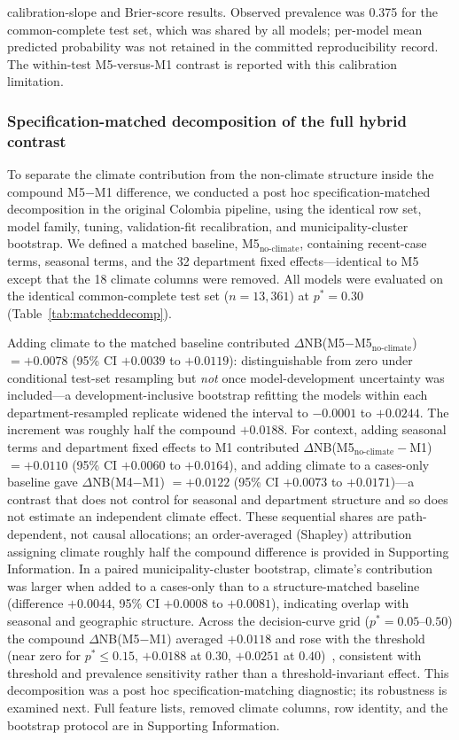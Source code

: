 \documentclass[11pt,a4paper]{article}
\begin{document}
calibration-slope and Brier-score results. Observed prevalence was 0.375 for the common-complete test set, which was shared by all models; per-model mean predicted probability was not retained in the committed reproducibility record. The within-test M5-versus-M1 contrast is reported with this calibration limitation.

\subsubsection*{Specification-matched decomposition of the full hybrid contrast}
To separate the climate contribution from the non-climate structure inside the compound M5$-$M1 difference, we conducted a post hoc specification-matched decomposition in the original Colombia pipeline, using the identical row set, model family, tuning, validation-fit recalibration, and municipality-cluster bootstrap. We defined a matched baseline, M5$_{\text{no-climate}}$, containing recent-case terms, seasonal terms, and the 32 department fixed effects---identical to M5 except that the 18 climate columns were removed. All models were evaluated on the identical common-complete test set ($n=13{,}361$) at $p^*=0.30$ (Table~\ref{tab:matcheddecomp}).

Adding climate to the matched baseline contributed $\Delta$NB(M5$-$M5$_{\text{no-climate}}$) $=+0.0078$ (95\% CI $+0.0039$ to $+0.0119$): distinguishable from zero under conditional test-set resampling but \emph{not} once model-development uncertainty was included---a development-inclusive bootstrap refitting the models within each department-resampled replicate widened the interval to $-0.0001$ to $+0.0244$. The increment was roughly half the compound $+0.0188$. For context, adding seasonal terms and department fixed effects to M1 contributed $\Delta$NB(M5$_{\text{no-climate}}-$M1) $=+0.0110$ (95\% CI $+0.0060$ to $+0.0164$), and adding climate to a cases-only baseline gave $\Delta$NB(M4$-$M1) $=+0.0122$ (95\% CI $+0.0073$ to $+0.0171$)---a contrast that does not control for seasonal and department structure and so does not estimate an independent climate effect. These sequential shares are path-dependent, not causal allocations; an order-averaged (Shapley) attribution assigning climate roughly half the compound difference is provided in Supporting Information. In a paired municipality-cluster bootstrap, climate's contribution was larger when added to a cases-only than to a structure-matched baseline (difference $+0.0044$, 95\% CI $+0.0008$ to $+0.0081$), indicating overlap with seasonal and geographic structure. Across the decision-curve grid ($p^*=0.05$--$0.50$) the compound $\Delta$NB(M5$-$M1) averaged $+0.0118$ and rose with the threshold (near zero for $p^*\le0.15$, $+0.0188$ at $0.30$, $+0.0251$ at $0.40$)~\cite{VanCalster2019,Vickers2016}, consistent with threshold and prevalence sensitivity rather than a threshold-invariant effect. This decomposition was a post hoc specification-matching diagnostic; its robustness is examined next. Full feature lists, removed climate columns, row identity, and the bootstrap protocol are in Supporting Information.
\end{document}
